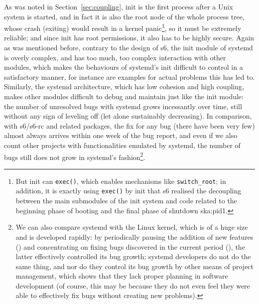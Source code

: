 As was noted in Section~\ref{sec:coupling}, init is the first process after
a Unix system is started, and in fact it is also the root node of the whole
process tree, whose crash (exiting) would result in a kernel panic\footnote{But
init can \texttt{exec()}, which enables mechanisms like \texttt{switch\_root};
in addition, it is exactly using \texttt{exec()} by init that s6 realised the
decoupling between the main submodules of the init system and code related to
the beginning phase of booting and the final phase of shutdown\cupercite%
{ska:pid1}.}, so it must be extremely reliable; and since init has root
permissions, it also has to be highly secure.  Again as was mentioned before,
contrary to the design of s6, the init module of systemd is overly complex,
and has too much, too complex interaction with other modules, which makes
the behaviours of systemd's init difficult to control in a satisfactory
manner, for instance \parencite{ayer2016, edge2017} are examples for actual
problems this has led to.  Similarly, the systemd architecture, which has
low cohesion and high coupling, makes other modules difficult to debug and
maintain just like the init module: the number of unresolved bugs with systemd
grows incessantly over time, still without any sign of leveling off (let alone
sustainably decreasing).  In comparison, with s6/s6-rc
and related packages, the fix for any bug (there have been very few) almost
always arrives within one week of the bug report, and even if we also count
other projects with functionalities emulated by systemd, the number of bugs
still does not grow in systemd's fashion\footnote{We can also compare systemd
with the Linux kernel, which is of a huge size and is developed rapidly: by
periodically pausing the addition of new features ()
and concentrating on fixing bugs discovered in the current period (), the latter effectively controlled its bug growth; systemd developers
do not do the same thing, and nor do they control its bug growth by other means
of project management, which shows that they lack proper planning in software
development (of course, this may be because they do not even feel they were
able to effectively fix bugs without creating new problems).}.


